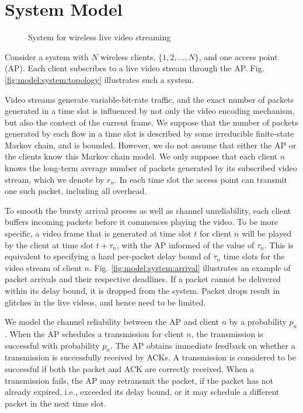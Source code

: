 \documentclass[10pt,nocopyrightspace]{sigplan-proc-varsize-1in}
\begin{document}
\section{System Model}  \label{section:model}
\begin{figure}[t]
\caption{System for wireless live video streaming}\label{fig:model:system}
\end{figure}


Consider a system with $N$ wireless clients, $\{1,2,\dots,N\}$, and one access point (AP). Each client subscribes to a live video stream through the AP. Fig. \ref{fig:model:system:topology} illustrates such a system. 

Video streams generate variable-bit-rate traffic, and the exact number of packets generated in a time slot is influenced by not only the video encoding mechanism, but also the context of the current frame. We suppose that the number of packets generated by each flow in a time slot is described by some irreducible finite-state Markov chain, and is bounded. However, we do not assume that either the AP or the clients know this Markov chain model. We only suppose that each client $n$ knows the long-term average number of packets generated by its subscribed video stream, which we denote by $r_n$.  In each time slot the access point can transmit one such packet, including all overhead.

To smooth the bursty arrival process as well as channel unreliability, each client buffers incoming packets before it commences playing the video. To be more specific, a video frame that is generated at time slot $t$ for client $n$ will be played by the client at time slot $t+\tau_n$, with the AP informed of the value of $\tau_n$. This is equivalent to specifying a hard per-packet delay bound of $\tau_n$ time slots for the video stream of client $n$. Fig. \ref{fig:model:system:arrival} illustrates an example of packet arrivals and their respective deadlines. If a packet cannot be delivered within its delay bound, it is dropped from the system. Packet drops result in glitches in the live videos, and hence need to be limited.

We model the channel reliability between the AP and client $n$ by a probability $p_n$. When the AP schedules a transmission for client $n$, the transmission is successful with probability $p_n$. The AP obtains immediate feedback on whether a transmission is successfully received by ACKs. A transmission is considered to be successful if both the packet and ACK are correctly received. When a transmission fails, the AP may retransmit the packet, if the packet has not already expired, i.e., exceeded its delay bound, or it may schedule a different packet in the next time slot.
\end{document}
